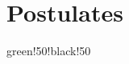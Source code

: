 \documentclass{book}
\begin{document}
\frontmatter



\listoffigures

\mainmatter

\chapter{Postulates}{green!50!black!50}







\backmatter


\printbibliography

\end{document}

